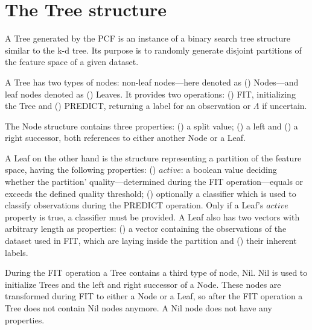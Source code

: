 \section{The Tree structure}
\label{sec:tree}

A Tree generated by the PCF is an instance of a binary
search tree structure similar to the k-d tree.
Its purpose is to randomly generate disjoint partitions of
the feature space of a given dataset.

A Tree has two types of nodes: non-leaf nodes---here
denoted as () Nodes---and leaf nodes
denoted as  () Leaves. It provides two
operations: () FIT, initializing the Tree
and () PREDICT, returning a label for an
observation or $\Lambda$ if uncertain.

The Node structure contains three properties:
() a split value; () a left
and () a right successor, both references to
either another Node or a Leaf.

A Leaf on the other hand is the structure representing a
partition of the feature space, having the following
properties: () $active$: a boolean value
deciding whether the partition' quality---determined
during the FIT operation---equals or exceeds the
defined quality threshold; () optionally a
classifier which is used to classify observations during
the PREDICT operation. Only if a Leaf's $active$ property
is true, a classifier must be provided. A Leaf also has two
vectors with arbitrary length as properties:
() a vector containing the observations of
the dataset used in FIT, which are laying inside the
partition and () their inherent labels.

During the FIT operation a Tree contains a third type of
node, Nil. Nil is used to initialize Trees
and the left and right successor of a Node. These nodes are
transformed during FIT to either a Node or a Leaf, so after
the FIT operation a Tree does not contain Nil nodes
anymore. A Nil node does not have any properties.




